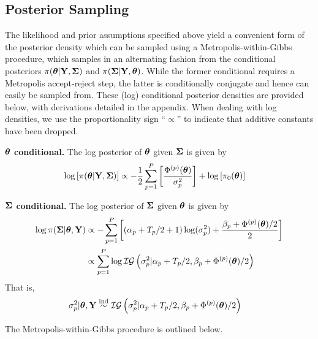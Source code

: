 \documentclass[12pt]{article}
\begin{document}
\subsection{Posterior Sampling}
The likelihood and prior assumptions specified above yield a convenient form of the posterior density which can be sampled using a Metropolis-within-Gibbs procedure, which samples in an 
alternating fashion from the conditional posteriors $\pi(\boldsymbol{\theta}|\mathbf{Y}, \boldsymbol{\Sigma})$ and $\pi(\boldsymbol{\Sigma}|\mathbf{Y}, \boldsymbol{\theta})$. While the former conditional requires a Metropolis 
accept-reject step, the latter is conditionally conjugate and hence can easily be sampled from. These (log) conditional posterior densities are provided below, with derivations detailed in 
the appendix. When dealing with log densities, we use the proportionality sign ``$\propto$'' to indicate that additive constants have been dropped. 

\bigskip
\noindent
\textbf{$\boldsymbol{\theta}$ conditional.} 
The log posterior of $\boldsymbol{\theta}$ given $\boldsymbol{\Sigma}$ is given by 
\begin{align*}
\log\left[\pi(\boldsymbol{\theta}|\mathbf{Y}, \boldsymbol{\Sigma})\right] &\propto -\frac{1}{2} \sum_{p = 1}^{P} \left[\frac{\Phi^{(p)}(\boldsymbol{\theta})}{\sigma_{p}^2}\right]  + \log\left[\pi_0(\boldsymbol{\theta})\right] 
\end{align*}

\bigskip
\noindent
\textbf{$\boldsymbol{\Sigma}$ conditional.}
The log posterior of $\boldsymbol{\Sigma}$ given $\boldsymbol{\theta}$ is given by 
\begin{align*}
\log \pi(\boldsymbol{\Sigma}|\boldsymbol{\theta}, \mathbf{Y}) &\propto -\sum_{p = 1}^{P} \left[\left(\alpha_{p} + T_{p}/2 + 1 \right)\log(\sigma_{p}^2) + \frac{\beta_{p} + 
								  \Phi^{(p)}(\boldsymbol{\theta})/2}{2} \right] \\
				      			       &\propto \sum_{p = 1}^{P} \log \mathcal{IG}\left(\sigma_{p}^2|\alpha_{p} + T_{p}/2, \beta_{p} + \Phi^{(p)}(\boldsymbol{\theta})/2 \right)
\end{align*}
That is, 
\begin{align}
\sigma_{p}^2|\boldsymbol{\theta}, \mathbf{Y} &\overset{\text{ind}}{\sim} \mathcal{IG}\left(\sigma_{p}^2|\alpha_{p} + T_{p}/2, \beta_{p} + \Phi^{(p)}(\boldsymbol{\theta})/2 \right) \label{cond_post_Cov}
\end{align}

The Metropolis-within-Gibbs procedure is outlined below. 
\end{document}
